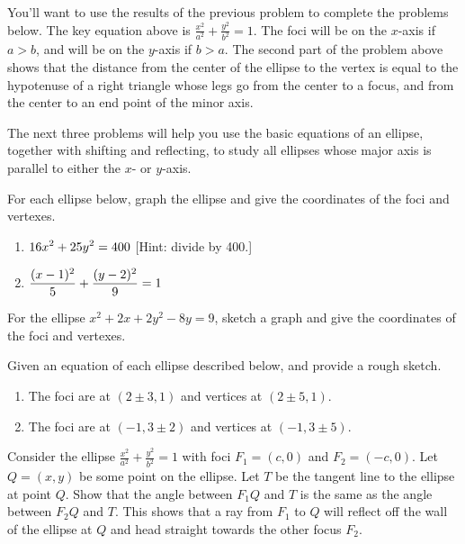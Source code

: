 You'll want to use the results of the previous problem to complete the problems below. The key equation above is $\frac{x^2}{a^2}+\frac{y^2}{b^2}=1$. The foci will be on the $x$-axis if $a>b$, and will be on the $y$-axis if $b>a$. The second part of the problem above shows that the distance from the center of the ellipse to the vertex is equal to the hypotenuse of a right triangle whose legs go from the center to a focus, and from the center to an end point of the minor axis. 

The next three problems will help you use the basic equations of an ellipse, together with shifting and reflecting, to study all ellipses whose major axis is parallel to either the $x$- or $y$-axis. 

\begin{problem}  
%
For each ellipse below, graph the ellipse and give the coordinates of the foci and vertexes. \begin{enumerate}
\item $\displaystyle 16x^2+25y^2=400$ [Hint: divide by 400.]
\item $\displaystyle \frac{(x-1)^2}{5}+\frac{(y-2)^2}{9}=1$
\end{enumerate}
\end{problem}

\begin{problem}
For the ellipse $x^2+2x+2y^2-8y=9$, sketch a graph and give the coordinates of the foci and vertexes. 
\end{problem}

\begin{problem} 
%
Given an equation of each ellipse described below, and provide a rough sketch.
\begin{enumerate}
\item The foci are at $(2\pm 3,1)$ and vertices at $(2\pm 5, 1)$.
\item The foci are at $(-1,3\pm 2)$ and vertices at $(-1, 3\pm 5)$.
\end{enumerate}
\end{problem}


\begin{problem*}[Optional]
Consider the ellipse $\frac{x^2}{a^2}+\frac{y^2}{b^2}=1$ with foci $F_1=(c,0)$ and $F_2=(-c,0)$. 
Let $Q=(x,y)$ be some point on the ellipse. 
Let $T$ be the tangent line to the ellipse at point $Q$. 
Show that the angle between $F_1Q$ and $T$ is the same as the angle between $F_2Q$ and $T$. This shows that a ray from $F_1$ to $Q$ will reflect off the wall of the ellipse at $Q$ and head straight towards the other focus $F_2$.
\end{problem*}


